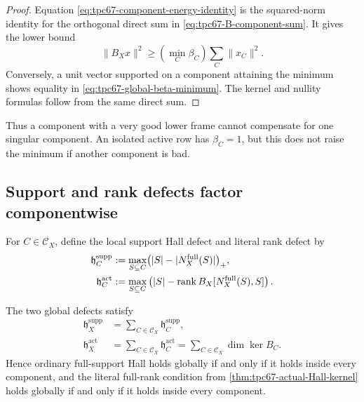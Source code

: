 \begin{proof}
Equation \eqref{eq:tpc67-component-energy-identity} is the squared-norm
identity for the orthogonal direct sum in
\eqref{eq:tpc67-B-component-sum}.  It gives the lower bound
\[
 \|B_Xx\|^2
 \ge
 \left(\min_C\beta_C\right)\sum_C\|x_C\|^2.
\]
Conversely, a unit vector supported on a component attaining the minimum
shows equality in \eqref{eq:tpc67-global-beta-minimum}.  The kernel and
nullity formulas follow from the same direct sum.
\end{proof}

Thus a component with a very good lower frame cannot compensate for one
singular component.  An isolated active row has \(\beta_C=1\), but this
does not raise the minimum if another component is bad.

\subsection{Support and rank defects factor componentwise}

For \(C\in\mathscr C_X\), define the local support Hall defect and literal
rank defect
by
\begin{align}
 \mathfrak h_C^{\mathrm{supp}}
 &:=
 \max_{S\subseteq C}
 \bigl(|S|-|N_X^{\mathrm{full}}(S)|\bigr)_+,
 \label{eq:tpc67-component-support-defect}\\
 \mathfrak h_C^{\mathrm{act}}
 &:=
 \max_{S\subseteq C}
 \left(
 |S|-\operatorname{rank} B_X[N_X^{\mathrm{full}}(S),S]
 \right).
 \label{eq:tpc67-component-actual-defect}
\end{align}

\begin{proposition}
\label{prop:tpc67-component-Hall-accounting}
The two global defects satisfy
\begin{align}
 \mathfrak h_X^{\mathrm{supp}}
 &=
 \sum_{C\in\mathscr C_X}
 \mathfrak h_C^{\mathrm{supp}},
 \label{eq:tpc67-support-defect-sum}\\
 \mathfrak h_X^{\mathrm{act}}
 &=
 \sum_{C\in\mathscr C_X}
 \mathfrak h_C^{\mathrm{act}}
 =
 \sum_{C\in\mathscr C_X}\dim\ker B_C.
 \label{eq:tpc67-actual-defect-sum}
\end{align}
Hence ordinary full-support Hall holds globally if and only if it holds
inside every component, and the literal full-rank condition from
\cref{thm:tpc67-actual-Hall-kernel} holds globally if and only if it holds
inside every component.
\end{proposition}

